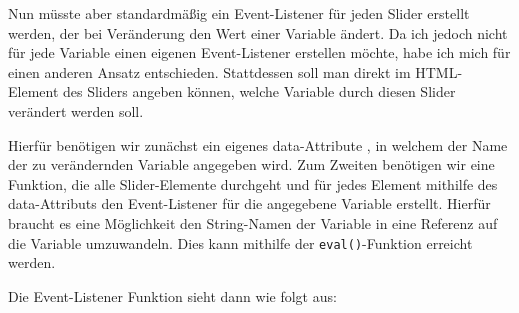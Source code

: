 Nun müsste aber standardmäßig ein Event-Listener für jeden Slider erstellt werden, der bei Veränderung den Wert einer Variable ändert. Da ich jedoch nicht für jede Variable einen eigenen Event-Listener erstellen möchte, habe ich mich für einen anderen Ansatz entschieden. Stattdessen soll man direkt im HTML-Element des Sliders angeben können, welche Variable durch diesen Slider verändert werden soll.

Hierfür benötigen wir zunächst ein eigenes data-Attribute , in welchem der Name der zu verändernden Variable angegeben wird. Zum Zweiten benötigen wir eine Funktion, die alle Slider-Elemente durchgeht und für jedes Element mithilfe des data-Attributs den Event-Listener für die angegebene Variable erstellt. Hierfür braucht es eine Möglichkeit den String-Namen der Variable in eine Referenz auf die Variable umzuwandeln. Dies kann mithilfe der \texttt{eval()}-Funktion erreicht werden.

Die Event-Listener Funktion sieht dann wie folgt aus:

